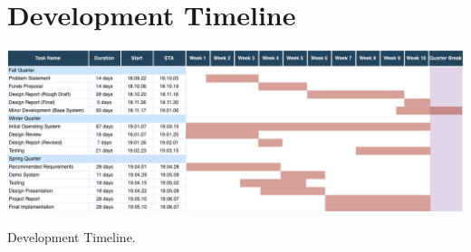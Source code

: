 \chapter{Development Timeline}


\begin{table}[h]
  \includegraphics[width=\linewidth]{DevelopmentTimeline.png}
  \caption{Development Timeline.}
  \label{table:timeline}
\end{table}
